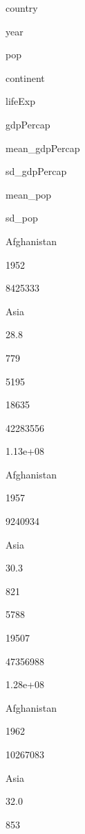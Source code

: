 \documentclass[]{book}
\newenvironment{Shaded}{\begin{snugshade}}{\end{snugshade}}
\newcommand{\KeywordTok}[1]{\textcolor[rgb]{0.13,0.29,0.53}{\textbf{#1}}}
\newcommand{\DataTypeTok}[1]{\textcolor[rgb]{0.13,0.29,0.53}{#1}}
\newcommand{\StringTok}[1]{\textcolor[rgb]{0.31,0.60,0.02}{#1}}
\newcommand{\OperatorTok}[1]{\textcolor[rgb]{0.81,0.36,0.00}{\textbf{#1}}}
\newcommand{\NormalTok}[1]{#1}
\begin{document}
\begin{Shaded}
\end{Shaded}

country

year

pop

continent

lifeExp

gdpPercap

mean\_gdpPercap

sd\_gdpPercap

mean\_pop

sd\_pop

Afghanistan

1952

8425333

Asia

28.8

779

5195

18635

42283556

1.13e+08

Afghanistan

1957

9240934

Asia

30.3

821

5788

19507

47356988

1.28e+08

Afghanistan

1962

10267083

Asia

32.0

853
\end{document}
